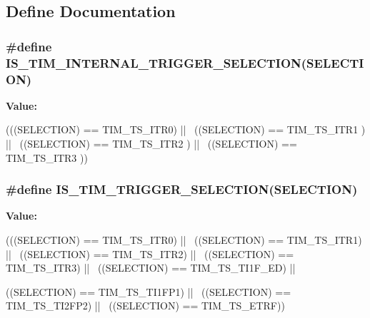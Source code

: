 \subsection{Define Documentation}
\hypertarget{group__TIM__Internal__Trigger__Selection_ga1ce6c387021e2fdaf3fa3d7cd3eae962}{
\subsubsection[{IS\_\-TIM\_\-INTERNAL\_\-TRIGGER\_\-SELECTION}]{\setlength{\rightskip}{0pt plus 5cm}\#define IS\_\-TIM\_\-INTERNAL\_\-TRIGGER\_\-SELECTION(SELECTION)}}
\label{group__TIM__Internal__Trigger__Selection_ga1ce6c387021e2fdaf3fa3d7cd3eae962}
{\bfseries Value:}
\begin{DoxyCode}
(((SELECTION) == TIM_TS_ITR0) || \
                                                      ((SELECTION) == TIM_TS_ITR1
      ) || \
                                                      ((SELECTION) == TIM_TS_ITR2
      ) || \
                                                      ((SELECTION) == TIM_TS_ITR3
      ))
\end{DoxyCode}
\hypertarget{group__TIM__Internal__Trigger__Selection_ga36e47cf625c695a368a68280e950dfbc}{
\subsubsection[{IS\_\-TIM\_\-TRIGGER\_\-SELECTION}]{\setlength{\rightskip}{0pt plus 5cm}\#define IS\_\-TIM\_\-TRIGGER\_\-SELECTION(SELECTION)}}
\label{group__TIM__Internal__Trigger__Selection_ga36e47cf625c695a368a68280e950dfbc}
{\bfseries Value:}
\begin{DoxyCode}
(((SELECTION) == TIM_TS_ITR0) || \
                                             ((SELECTION) == TIM_TS_ITR1) || \
                                             ((SELECTION) == TIM_TS_ITR2) || \
                                             ((SELECTION) == TIM_TS_ITR3) || \
                                             ((SELECTION) == TIM_TS_TI1F_ED) || \
      
                                             ((SELECTION) == TIM_TS_TI1FP1) || \
                                             ((SELECTION) == TIM_TS_TI2FP2) || \
                                             ((SELECTION) == TIM_TS_ETRF))
\end{DoxyCode}

